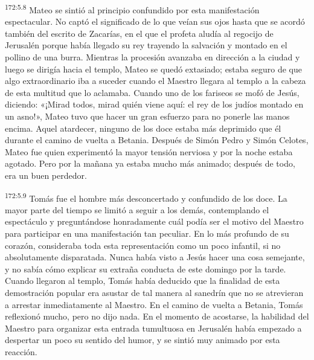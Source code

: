 \par 
\textsuperscript{172:5.8} Mateo se sintió al principio confundido por esta manifestación espectacular. No captó el significado de lo que veían sus ojos hasta que se acordó también del escrito de Zacarías, en el que el profeta aludía al regocijo de Jerusalén porque había llegado su rey trayendo la salvación y montado en el pollino de una burra. Mientras la procesión avanzaba en dirección a la ciudad y luego se dirigía hacia el templo, Mateo se quedó extasiado; estaba seguro de que algo extraordinario iba a suceder cuando el Maestro llegara al templo a la cabeza de esta multitud que lo aclamaba. Cuando uno de los fariseos se mofó de Jesús, diciendo: «¡Mirad todos, mirad quién viene aquí: el rey de los judíos montado en un asno!», Mateo tuvo que hacer un gran esfuerzo para no ponerle las manos encima. Aquel atardecer, ninguno de los doce estaba más deprimido que él durante el camino de vuelta a Betania. Después de Simón Pedro y Simón Celotes, Mateo fue quien experimentó la mayor tensión nerviosa y por la noche estaba agotado. Pero por la mañana ya estaba mucho más animado; después de todo, era un buen perdedor.

\par 
\textsuperscript{172:5.9} Tomás fue el hombre más desconcertado y confundido de los doce. La mayor parte del tiempo se limitó a seguir a los demás, contemplando el espectáculo y preguntándose honradamente cuál podía ser el motivo del Maestro para participar en una manifestación tan peculiar. En lo más profundo de su corazón, consideraba toda esta representación como un poco infantil, si no absolutamente disparatada. Nunca había visto a Jesús hacer una cosa semejante, y no sabía cómo explicar su extraña conducta de este domingo por la tarde. Cuando llegaron al templo, Tomás había deducido que la finalidad de esta demostración popular era asustar de tal manera al sanedrín que no se atrevieran a arrestar inmediatamente al Maestro. En el camino de vuelta a Betania, Tomás reflexionó mucho, pero no dijo nada. En el momento de acostarse, la habilidad del Maestro para organizar esta entrada tumultuosa en Jerusalén había empezado a despertar un poco su sentido del humor, y se sintió muy animado por esta reacción.


